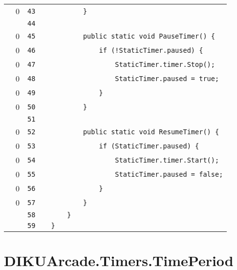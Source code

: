\documentclass[a4paper,landscape,10pt]{article}
\begin{document}
\begin{longtable}[l]{lrrll}
\cellcolor{red} & 0 & \verb~43~ & & \verb~        }~\\
\cellcolor{gray} &  & \verb~44~ & & \verb~~\\
\cellcolor{red} & 0 & \verb~45~ & & \verb~        public static void PauseTimer() {~\\
\cellcolor{red} & 0 & \verb~46~ & & \verb~            if (!StaticTimer.paused) {~\\
\cellcolor{red} & 0 & \verb~47~ & & \verb~                StaticTimer.timer.Stop();~\\
\cellcolor{red} & 0 & \verb~48~ & & \verb~                StaticTimer.paused = true;~\\
\cellcolor{red} & 0 & \verb~49~ & & \verb~            }~\\
\cellcolor{red} & 0 & \verb~50~ & & \verb~        }~\\
\cellcolor{gray} &  & \verb~51~ & & \verb~~\\
\cellcolor{red} & 0 & \verb~52~ & & \verb~        public static void ResumeTimer() {~\\
\cellcolor{red} & 0 & \verb~53~ & & \verb~            if (StaticTimer.paused) {~\\
\cellcolor{red} & 0 & \verb~54~ & & \verb~                StaticTimer.timer.Start();~\\
\cellcolor{red} & 0 & \verb~55~ & & \verb~                StaticTimer.paused = false;~\\
\cellcolor{red} & 0 & \verb~56~ & & \verb~            }~\\
\cellcolor{red} & 0 & \verb~57~ & & \verb~        }~\\
\cellcolor{gray} &  & \verb~58~ & & \verb~    }~\\
\cellcolor{gray} &  & \verb~59~ & & \verb~}~\\
\end{longtable}
\newpage
\section{DIKUArcade.Timers.TimePeriod}
\end{document}
